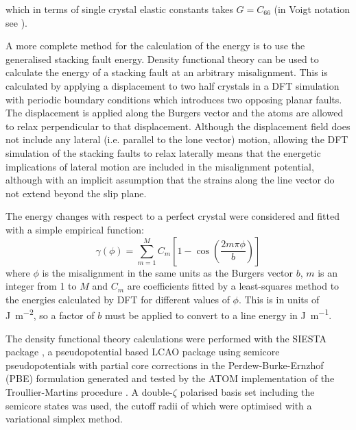 which in terms of single crystal elastic constants takes $G=C_{66}$ (in Voigt notation see \cite{kelly_knowles2012chapter6_stress_strain}).

A more complete method for the calculation of the energy is to use the generalised stacking fault energy. Density functional theory can be used to calculate the energy of a stacking fault at an arbitrary misalignment. This is calculated by applying a displacement to two half crystals in a DFT simulation with periodic boundary conditions which introduces two opposing planar faults. The displacement is applied along the Burgers vector and the atoms are allowed to relax perpendicular to that displacement. Although the displacement field does not include any lateral (i.e. parallel to the lone vector) motion, allowing the DFT simulation of the stacking faults to relax laterally means that the energetic implications of lateral motion are included in the misalignment potential, although with an implicit assumption that the strains along the line vector do not extend beyond the slip plane. 

The energy changes with respect to a perfect crystal were considered and fitted with a simple empirical function:
\begin{equation}
\gamma(\phi) = \sum^{M}_{m=1} C_m \left[ 1 - \cos \left( \frac{2m\pi \phi}{b} \right) \right]
\end{equation}
where $\phi$ is the misalignment in the same units as the Burgers vector $b$, $m$ is an integer from \num{1} to $M$ and $C_m$ are coefficients fitted by a least-squares method to the energies calculated by DFT for different values of $\phi$. This is in units of \si{\joule\per\square\meter}, so a factor of $b$ must be applied to convert to a line energy in \si{\joule\per\meter}.




The density functional theory calculations were performed with the SIESTA package \cite{soler2002}, a pseudopotential based LCAO package using semicore pseudopotentials with partial core corrections in the Perdew-Burke-Ernzhof (PBE) formulation generated and tested by the ATOM implementation of the Troullier-Martins procedure \cite{Troullier1991,Troullier1991a}. A double-$\zeta$ polarised basis set including the semicore states was used, the cutoff radii of which were optimised with a variational simplex method.



